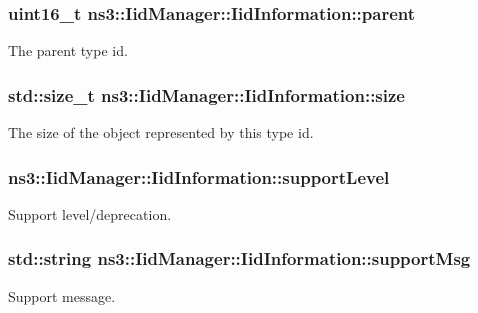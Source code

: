 \subsubsection[{\texorpdfstring{parent}{parent}}]{\setlength{\rightskip}{0pt plus 5cm}uint16\+\_\+t ns3\+::\+Iid\+Manager\+::\+Iid\+Information\+::parent}\hypertarget{structns3_1_1IidManager_1_1IidInformation_a1b224389afab82f4a8e5d17227387b60}{}\label{structns3_1_1IidManager_1_1IidInformation_a1b224389afab82f4a8e5d17227387b60}
The parent type id. 
\subsubsection[{\texorpdfstring{size}{size}}]{\setlength{\rightskip}{0pt plus 5cm}std\+::size\+\_\+t ns3\+::\+Iid\+Manager\+::\+Iid\+Information\+::size}\hypertarget{structns3_1_1IidManager_1_1IidInformation_a815c69fdfdf6d43c59f16b9e5d4847f6}{}\label{structns3_1_1IidManager_1_1IidInformation_a815c69fdfdf6d43c59f16b9e5d4847f6}
The size of the object represented by this type id. 
\subsubsection[{\texorpdfstring{support\+Level}{supportLevel}}]{ ns3\+::\+Iid\+Manager\+::\+Iid\+Information\+::support\+Level}\hypertarget{structns3_1_1IidManager_1_1IidInformation_afd31dd228a6b5687ccefec579b30d5eb}{}\label{structns3_1_1IidManager_1_1IidInformation_afd31dd228a6b5687ccefec579b30d5eb}
Support level/deprecation. 
\subsubsection[{\texorpdfstring{support\+Msg}{supportMsg}}]{\setlength{\rightskip}{0pt plus 5cm}std\+::string ns3\+::\+Iid\+Manager\+::\+Iid\+Information\+::support\+Msg}\hypertarget{structns3_1_1IidManager_1_1IidInformation_a86ba4a9a7826d3f489f406ce12b8e67a}{}\label{structns3_1_1IidManager_1_1IidInformation_a86ba4a9a7826d3f489f406ce12b8e67a}
Support message. 
